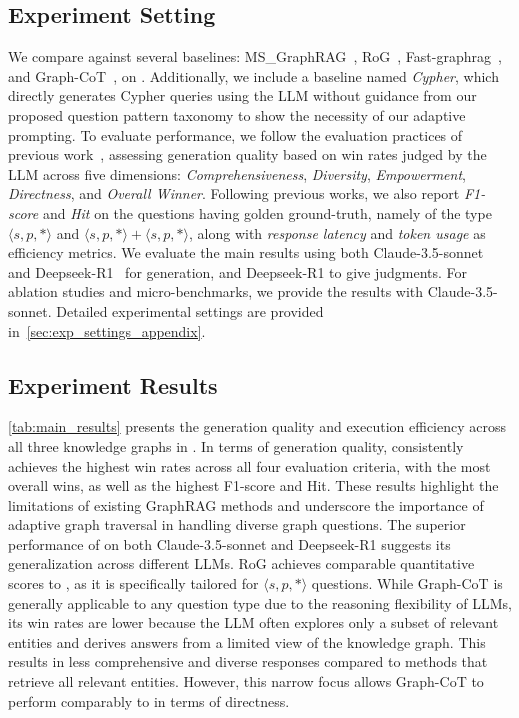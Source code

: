 \subsection{Experiment Setting}

We compare \name{} against several baselines: MS\_GraphRAG~\cite{ms_graphrag}, RoG~\cite{rog}, Fast-graphrag~\cite{fast_graphrag}, and Graph-CoT~\cite{graphcot}, on \benchmarkname{}. Additionally, we include a baseline named \textit{Cypher}, which directly generates Cypher queries using the LLM without guidance from our proposed question pattern taxonomy to show the necessity of our adaptive prompting. To evaluate performance, we follow the evaluation practices of previous work~\cite{ms_graphrag, lightrag}, assessing generation quality based on win rates judged by the LLM across five dimensions: \textit{Comprehensiveness}, \textit{Diversity}, \textit{Empowerment}, \textit{Directness}, and \textit{Overall Winner}. Following previous works, we also report \textit{F1-score} and \textit{Hit} on the questions having golden ground-truth, namely of the type $\langle s,p,* \rangle$ and $\langle s,p,* \rangle + \langle s,p,* \rangle$, along with \textit{response latency} and \textit{token usage} as efficiency metrics. We evaluate the main results using both Claude-3.5-sonnet~\cite{claude} and Deepseek-R1~\cite{deepseekr1} for generation, and Deepseek-R1 to give judgments. For ablation studies and micro-benchmarks, we provide the results with Claude-3.5-sonnet. Detailed experimental settings are provided in~\autoref{sec:exp_settings_appendix}.


\subsection{Experiment Results}

 \autoref{tab:main_results} presents the generation quality and execution efficiency across all three knowledge graphs in \benchmarkname{}. In terms of generation quality, \name{} consistently achieves the highest win rates across all four evaluation criteria, with the most overall wins, as well as the highest F1-score and Hit. These results highlight the limitations of existing GraphRAG methods and underscore the importance of adaptive graph traversal in handling diverse graph questions. The superior performance of \name{} on both Claude-3.5-sonnet and Deepseek-R1 suggests its generalization across different LLMs. RoG achieves comparable quantitative scores to \name{}, as it is specifically tailored for $\langle s,p,* \rangle$ questions. While Graph-CoT is generally applicable to any question type due to the reasoning flexibility of LLMs, its win rates are lower because the LLM often explores only a subset of relevant entities and derives answers from a limited view of the knowledge graph. This results in less comprehensive and diverse responses compared to methods that retrieve all relevant entities. However, this narrow focus allows Graph-CoT to perform comparably to \name{} in terms of directness.


